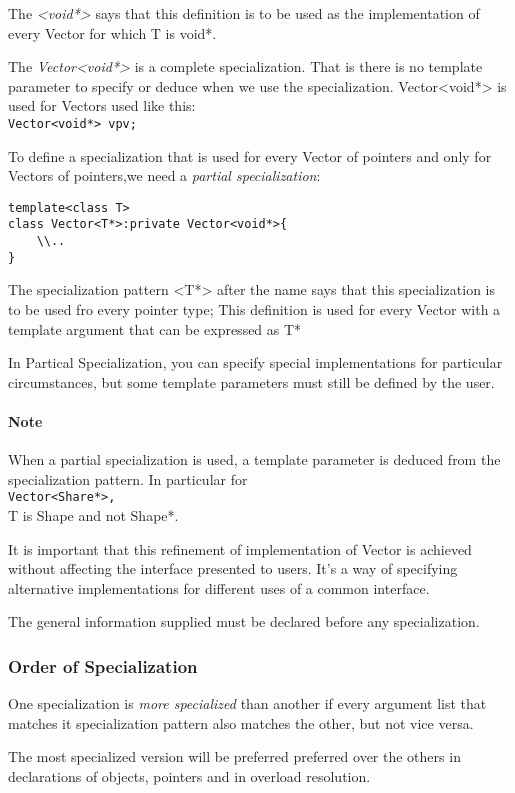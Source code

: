 \documentclass[11pt, a4paper]{book}
\begin{document}
\begin{itemize}
The \emph{<void*>} says that this definition is to be used as the implementation of every Vector for which T is void*. 

The \emph{Vector<void*>} is a complete specialization. That is there is no template parameter to specify or deduce when we use the specialization. Vector<void*> is used for Vectors used like this:\\\verb|Vector<void*> vpv;|

To define a specialization that is used for every Vector of pointers and only for Vectors of pointers,we need a \emph{partial specialization}:
\begin{verbatim}
template<class T>
class Vector<T*>:private Vector<void*>{
    \\..
}
\end{verbatim}

The specialization pattern <T*> after the name says that this specialization is to be used fro every pointer type; This definition is used for every Vector with a template argument that can be expressed as T*

In Partical Specialization, you can specify special implementations for particular circumstances, but some template parameters must still be defined by the user.

\paragraph{Note} When a partial specialization is used, a template parameter is deduced from the specialization pattern. In particular for \\\verb|Vector<Share*>, |\\ T is Shape and not Shape*.

It is important that this refinement of implementation of Vector is achieved without affecting the interface presented to users. It's a way of specifying alternative implementations for different uses of a common interface.

The general information supplied must be declared before any specialization.

\subsubsection{Order of Specialization}
One specialization is \emph{more specialized} than another if every argument list that matches it specialization pattern also matches the other, but not vice versa.

The most specialized version will be preferred preferred over the others in declarations of objects, pointers and in overload resolution.

\end{itemize}
\end{document}
